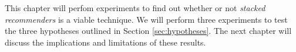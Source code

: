 \label{chap:results}

This chapter will perfom experiments to find out whether or not
\emph{stacked recommenders} is a viable technique.
We will perform three experiments to 
test the three hypotheses outlined in Section 
\ref{sec:hypotheses}.
The next chapter will discuss the implications 
and limitations of these results.


%





%

